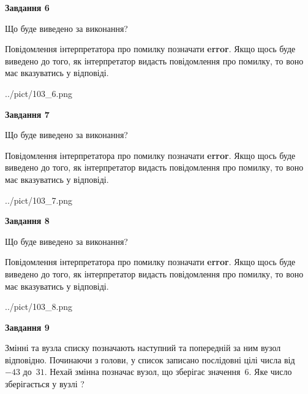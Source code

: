 \documentclass[12pt, ukrainian]{article}
\begin{document}
{\begin {large}
{\begin {center}\textbf{Завдання 6}\end {center}}\par
Що буде виведено за виконання?

Повідомлення інтерпретатора про помилку позначати \textbf{error}.
Якщо щось буде виведено до того, як інтерпретатор видасть повідомлення про помилку, 
то воно має вказуватись у відповіді. \par


\begin{center}
	{../pict/103_6.png}
\end{center}
\newpage

{\begin {center}\textbf{Завдання 7}\end {center}}\par
Що буде виведено за виконання?

Повідомлення інтерпретатора про помилку позначати \textbf{error}.
Якщо щось буде виведено до того, як інтерпретатор видасть повідомлення про помилку, 
то воно має вказуватись у відповіді. \par


\begin{center}
	{../pict/103_7.png}
\end{center}
\newpage

{\begin {center}\textbf{Завдання 8}\end {center}}\par
Що буде виведено за виконання?

Повідомлення інтерпретатора про помилку позначати \textbf{error}.
Якщо щось буде виведено до того, як інтерпретатор видасть повідомлення про помилку, 
то воно має вказуватись у відповіді. \par


\begin{center}
	{../pict/103_8.png}
\end{center}
\newpage

{\begin {center}\textbf{Завдання 9}\end {center}}\par
Змінні  та  вузла списку позначають наступний та попередній за ним вузол відповідно. Починаючи з голови, у список записано послідовні цілі числа від~$-43$ до~$31$. Нехай змінна  позначає вузол, що зберігає значення~$6$.
Яке число зберігається у вузлі  ?\par
\newpage


\end{large}}
\end{document}
